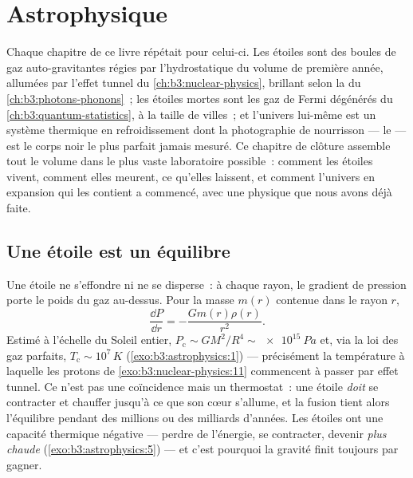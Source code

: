 \chapter{Astrophysique}\label{ch:b3:astrophysics}


Chaque chapitre de ce livre répétait pour celui-ci. Les étoiles sont
des boules de gaz auto-gravitantes régies par l'hydrostatique du
volume de première année, allumées par l'effet tunnel du
\cref{ch:b3:nuclear-physics}, brillant selon la  du
\cref{ch:b3:photons-phonons}~; les étoiles mortes sont les gaz de
Fermi dégénérés du \cref{ch:b3:quantum-statistics}, à la taille de
villes~; et l'univers lui-même est un système thermique en
refroidissement dont la photographie de nourrisson --- le  --- est le corps noir le plus parfait jamais mesuré. Ce
chapitre de clôture assemble tout le volume dans le plus vaste
laboratoire possible~: comment les étoiles vivent, comment elles
meurent, ce qu'elles laissent, et comment l'univers en expansion qui
les contient a commencé, avec une physique que nous avons déjà faite.

\section{Une étoile est un équilibre}

\begin{proposition}\label{prop:b3:astrophysics:hydrostatic}
Une étoile ne s'effondre ni ne se disperse~: à chaque rayon, le
gradient de pression porte le poids du gaz au-dessus. Pour la masse
$m(r)$ contenue dans le rayon $r$,
\[
\frac{\dd P}{\dd r} = -\frac{Gm(r)\rho(r)}{r^2} .
\]
Estimé à l'échelle du Soleil entier, $P_{\text{c}} \sim GM^2/R^4 \sim
\qty{e15}{Pa}$ et, via la loi des gaz parfaits, $T_{\text{c}} \sim
10^7\,\unit{K}$ (\cref{exo:b3:astrophysics:1}) --- précisément la
température à laquelle les protons de
\cref{exo:b3:nuclear-physics:11} commencent à passer par effet
tunnel. Ce n'est pas une coïncidence mais un thermostat~: une étoile
\emph{doit} se contracter et chauffer jusqu'à ce que son cœur
s'allume, et la fusion tient alors l'équilibre pendant des millions
ou des milliards d'années. Les étoiles ont une capacité thermique
négative --- perdre de l'énergie, se contracter, devenir
\emph{plus chaude} (\cref{exo:b3:astrophysics:5}) --- et c'est
pourquoi la gravité finit toujours par gagner.
\end{proposition}

